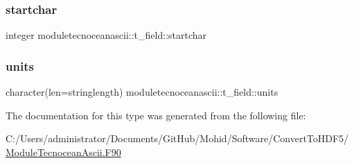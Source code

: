 \subsubsection{\texorpdfstring{startchar}{startchar}}
{\footnotesize\ttfamily integer moduletecnoceanascii\+::t\+\_\+field\+::startchar\hspace{0.3cm}{\ttfamily [private]}}

\mbox{\label{structmoduletecnoceanascii_1_1t__field_a0fcd912aafcd5259f4caa8c4ca6b3dd5}} 
\subsubsection{\texorpdfstring{units}{units}}
{\footnotesize\ttfamily character(len=stringlength) moduletecnoceanascii\+::t\+\_\+field\+::units\hspace{0.3cm}{\ttfamily [private]}}



The documentation for this type was generated from the following file\+:\begin{DoxyCompactItemize}
\item 
C\+:/\+Users/administrator/\+Documents/\+Git\+Hub/\+Mohid/\+Software/\+Convert\+To\+H\+D\+F5/\mbox{\hyperlink{_module_tecnocean_ascii_8_f90}{Module\+Tecnocean\+Ascii.\+F90}}\end{DoxyCompactItemize}
